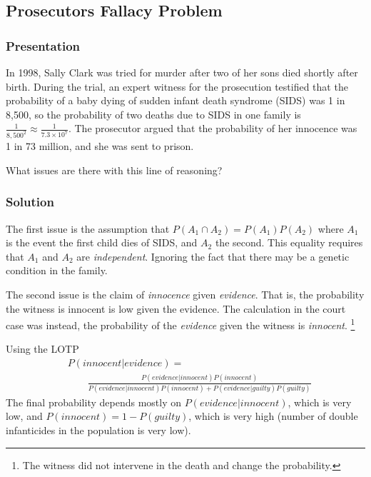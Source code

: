 \documentclass[11pt,a4paper]{article}
\begin{document}
\subsection{Prosecutors Fallacy Problem}

\subsubsection{Presentation}

In 1998, 
Sally Clark was tried for murder after two of her sons died shortly after birth. 
During the trial, 
an expert witness for the prosecution testified that the probability of a baby dying of sudden infant 
death syndrome (SIDS) was 1 in 8,500, 
so the probability of two deaths due to SIDS in one family is \(\frac{1}{{8,500}^{2}} \approx \frac{1}{7.3\times10^7}\). 
The prosecutor argued that the probability of her innocence was 1 in 73 million, 
and she was sent to prison.

What issues are there with this line of reasoning?

\newpage
\subsubsection{Solution}

The first issue is the assumption that 
\(P\left( A_{1} \cap A_{2} \right) = P\left( A_{1} \right)P(A_{2})\)
where \(A_{1}\) is the event the first child dies of SIDS, and \(A_{2}\) the second. 
This equality requires that \(A_{1}\) and \(A_{2}\) are \emph{independent}. 
Ignoring the fact that there may be a genetic condition in the family.

The second issue is the claim of \emph{innocence} given \emph{evidence}.
That is, 
the probability the witness is innocent is low given the evidence. 
The calculation in the court case was instead, 
the probability of the \emph{evidence} given the witness is \emph{innocent}.%
\footnote{The witness did not intervene in the death and change the probability.}

Using the LOTP
\begin{equation}
\begin{split}
    & P\left( innocent | evidence \right) = \\
        & \qquad \frac{P\left( evidence | innocent \right)P(innocent)}{P\left( evidence | innocent  \right)P(innocent) + P(evidence|guilty)P(guilty)}
\end{split}
\end{equation}
The final probability depends mostly on \(P(evidence|innocent)\), 
which is very low, 
and \(P(innocent) = 1 - P(guilty)\), 
which is very high (number of double infanticides in the population is very low).
\end{document}

